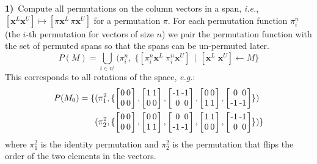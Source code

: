 \documentclass[10pt,preprint,numbers]{sigplanconf}
\theoremstyle{definition}
\newcommand{\ie}{\emph{i.e.}}
\newcommand{\eg}{\emph{e.g.}}
\newcommand{\vect}[1]{\textbf{#1}}
\newcommand{\vtwo}[2]{\setlength{\arraycolsep}{0em}
\left[\begin{array}{l}#1\\#2\end{array}\right]}
\newcommand{\stwo}[4]
{\setlength{\arraycolsep}{0.1em}
\left[\begin{array}{rr}$#1$ & $#3$\\$#2$ & $#4$\end{array}\right]}
\begin{document}
\noindent
\textbf{1)\,} Compute all permutations on the column vectors in a span, \ie{},
  $[\vect{x}^L \vect{x}^U] \mapsto [\pi\vect{x}^L \, \pi\vect{x}^U]$
for a permutation $\pi$. For each permutation function $\pi^n_i$
(the $i$-th permutation for vectors of size $n$) we pair the
permutation function with the set of permuted spans so that
the spans can be un-permuted later.
%
\begin{equation*}
P(M) = \bigcup_{i \in n!} (\pi^n_{i} , \; \{[\pi^n_i
\vect{x}^L \; \pi^n_i\vect{x}^U] \, \mid \, [\vect{x}^L \; \vect{x}^U]
\leftarrow M\}
\end{equation*}
%
This corresponds to all rotations of the space, \eg{}:
%
\begin{align*}
P(M_0) =
\{&(\pi^2_1, \{ \stwo{0}{0}{0}{0},
\stwo{1}{0}{1}{0},
\stwo{-1}{0}{-1}{0},
\stwo{0}{1}{0}{1},
\stwo{0}{-1}{0}{-1} \})
\\
&(\pi^2_2, \{
 \stwo{0}{0}{0}{0},
 \stwo{0}{1}{0}{1},
 \stwo{0}{-1}{0}{-1},
 \stwo{1}{0}{1}{0},
 \stwo{-1}{0}{-1}{0}\})\}
\end{align*}
%
where $\pi^2_1$ is the identity permutation and $\pi^2_2$ is the
permutation that flips the order of the two elements in the
vectors.
\end{document}
